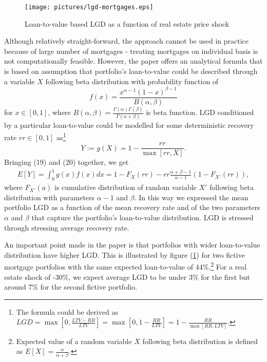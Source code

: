 \documentclass[a4paper]{article}
\begin{document}
\begin{center}
\begin{figure}[htp]
\centering
\texttt{[image: pictures/lgd-mortgages.eps]}
\caption{Loan-to-value based LGD as a function of real estate price shock}
\label{lgd-mortgages}
\end{figure}
\end{center}

Although relatively straight-forward, the approach cannot be used in practice because of large number of mortgages - treating mortgages on individual basis is not computationally feasible.
However, the paper offers an analytical formula that is based on assumption that portfolio's
loan-to-value could be described through a variable $X$ following beta distribution with probability function of
\begin{equation}
	f(x) = \frac{x^{\alpha - 1}(1 - x)^{\beta - 1}}{B(\alpha, \beta)}
\end{equation}
for $x \in [0, 1]$, where $B(\alpha, \beta) = \frac{\Gamma(\alpha)\Gamma(\beta)}{\Gamma(\alpha + \beta)}$ is beta function. LGD conditioned by a particular loan-to-value could be modelled
for some deterministic recovery rate $rr \in [0, 1]$ as\footnote{The formula could be derived as $LGD = \max\left[0, \frac{LTV - RR}{LTV}\right] = \max\left[0, 1 - \frac{RR}{LTV}\right] = 1 - \frac{RR}{\max[RR, LTV]}$.}
\begin{equation}
	Y := g(X) = 1 - \frac{rr}{\max[rr, X]}.
\end{equation}
Bringing (19) and (20) together, we get
\begin{multline}
	E[Y] = \int_0^1 g(x)f(x)dx = 1 - F_{X}(rr) - rr \frac{\alpha + \beta - 1}{\alpha - 1}(1 - F_{X'}(rr)),
\end{multline}
where $F_{X'}(a)$ is cumulative distribution of random variable $X'$ following beta distribution with parameters $\alpha - 1$ and $\beta$.{}
In this way we expressed the mean portfolio LGD as a function
of the mean recovery rate and of the two parameters $\alpha$ and $\beta$ that capture the portfolio's loan-to-value distribution. LGD is stressed through stressing average recovery rate.

An important point made in the paper is that portfolios with wider loan-to-value distribution have higher LGD.
This is illustrated by figure (\ref{lgd-mortgages}) for two fictive mortgage portfolios with the same expected loan-to-value of 44\%.\footnote{Expected value of a random variable $X$ following beta distribution is defined as $E[X] = \frac{\alpha}{\alpha + \beta}$.}
For a real estate shock of -30\%, we expect average LGD to be under 3\% for the first but around 7\% for the second fictive portfolio.
\end{document}
